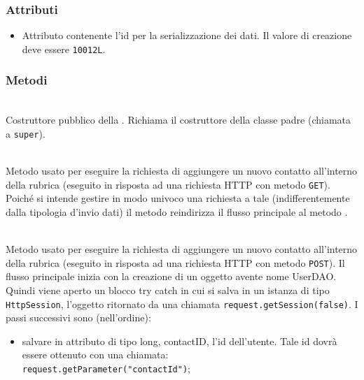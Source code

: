 \subsubsection*{Attributi}

\begin{itemize}
	\item{}
	Attributo contenente l'id per la serializzazione dei dati. Il valore di creazione deve essere \texttt{10012L}.
\end{itemize}

\subsubsection*{Metodi}

\begin{description}
	\item{}\\
	Costruttore pubblico della . Richiama il costruttore della classe padre (chiamata a \texttt{super}).
	
	\item{}\\
	Metodo usato per eseguire la richiesta di aggiungere un nuovo contatto all'interno della rubrica (eseguito in risposta ad una richiesta HTTP con metodo \texttt{GET}). Poiché si intende gestire in modo univoco una richiesta a tale  (indifferentemente dalla tipologia d'invio dati) il metodo reindirizza il flusso principale al metodo .
	
	\item{}\\	
	Metodo usato per eseguire la richiesta di aggiungere un nuovo contatto all'interno della rubrica (eseguito in risposta ad una richiesta HTTP con metodo \texttt{POST}). Il flusso principale inizia  con la creazione di un oggetto  avente nome UserDAO. Quindi viene aperto un blocco try catch in cui si salva in un istanza di tipo \texttt{HttpSession}, l'oggetto ritornato da una chiamata \verb|request.getSession(false)|. I passi successivi sono (nell'ordine):
	\begin{itemize}
		\item salvare in attributo di tipo long, contactID, l'id dell'utente. Tale id dovrà essere ottenuto con una chiamata:\\
		\verb|request.getParameter("contactId")|;\\
		

\end{itemize}
\end{description}
